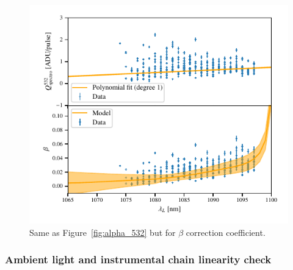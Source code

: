 \begin{figure}[h]
    \centering
    \includegraphics[width=\columnwidth]{fig/beta_532_qswMAX.pdf}
    \caption{Same as Figure~\ref{fig:alpha_532} but for $\beta$ correction coefficient.}
    \label{fig:beta}
\end{figure}


\subsubsection{Ambient light and instrumental chain linearity check}\label{sec:sc_linearity}







